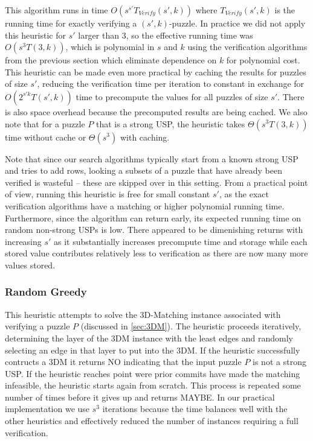 \documentclass[11pt]{article}
\begin{document}
This algorithm runs in time $O(s^{s'} T_{Verify}(s', k))$ where
$T_{Verify}(s',k)$ is the running time for exactly verifying a
$(s',k)$-puzzle.  In practice we did not apply this heuristic for $s'$
larger than $3$, so the effective running time was $O(s^3 T(3,k))$,
which is polynomial in $s$ and $k$ using the verification algorithms
from the previous section which eliminate dependence on $k$ for
polynomial cost.  This heuristic can be made even more practical by
caching the results for puzzles of size $s'$, reducing the
verification time per iteration to constant in exchange for
$O(2^{s'k}T(s',k))$ time to precompute the values for all puzzles of
size $s'$.  There is also space overhead because the precomputed
results are being cached.  We also note that for a puzzle $P$ that is
a strong USP, the heuristic takes $\Theta(s^3 T(3,k))$ time without
cache or $\Theta(s^3)$ with caching.

Note that since our search algorithms typically start from a known
strong USP and tries to add rows, looking a subsets of a puzzle that
have already been verified is wasteful -- these are skipped over in
this setting.  From a practical point of view, running this heuristic
is free for small constant $s'$, as the exact verification algorithms
have a matching or higher polynomial running time.  Furthermore, since
the algorithm can return early, its expected running time on random
non-strong USPs is low.  There appeared to be dimenishing returns with
increasing $s'$ as it substantially increases precompute time and
storage while each stored value contributes relatively less to
verification as there are now many more values stored.

\subsubsection{Random Greedy}

This heuristic attempts to solve the 3D-Matching instance associated
with verifying a puzzle $P$ (discussed in \autoref{sec:3DM}).  The
heuristic proceeds iteratively, determining the layer of the 3DM
instance with the least edges and randomly selecting an edge in that
layer to put into the 3DM.  If the heuristic successfully contructs a
3DM it returns NO indicating that the input puzzle $P$ is not a strong
USP.  If the heuristic reaches point were prior commits have made the
matching infeasible, the heuristic starts again from scratch.  This
process is repeated some number of times before it gives up and
returns MAYBE.  In our practical implementation we use $s^3$
iterations because the time balances well with the other heuristics
and effectively reduced the number of instances requiring a full
verification.
\end{document}
